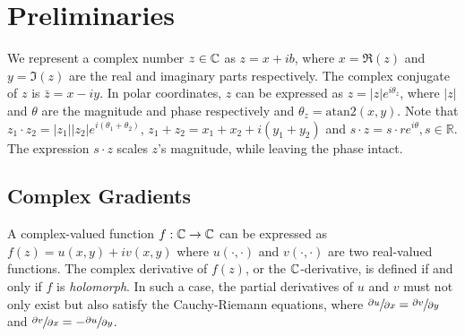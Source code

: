 \documentclass{article}
\begin{document}
\section{Preliminaries}
We represent a complex number $z \in \mathbb{C}$ as $z = x + ib$, where $x = \Re{(z)}$ and $y = \Im{(z)}$ are the real and imaginary parts respectively.  The complex conjugate of $z$ is $\bar{z} = x - iy$.  In polar coordinates, $z$ can be expressed as $z = |z| e^{i\theta_z}$, where $|z|$ and $\theta$ are the magnitude and phase respectively %
and $\theta_z=\text{atan2}(x,y)$. Note that $z_1\cdot z_2 = |z_1||z_2|e^{i(\theta_1 + \theta_2)}$, $z_1 + z_2 = x_1 + x_2 + i(y_1 + y_2)$ and $s\cdot z = s\cdot r e^{i\theta}, s \in \mathbb{R}$. The expression $s\cdot z$ scales $z$'s magnitude, while leaving the phase intact. 

\subsection{Complex Gradients}
A complex-valued function $f : \mathbb{C} \to \mathbb{C}$ can be expressed as $f(z) = u(x,y) + i v(x,y)$ where $u(\cdot,\cdot)$ and $v(\cdot,\cdot)$ are two real-valued functions.  The complex derivative of $f(z)$, or the $\mathbb{C}$-derivative, %
is defined if and only if $f$ is \emph{holomorph}. %
In such a case, the partial derivatives of $u$ and $v$ %
must not only exist but also satisfy the Cauchy-Riemann equations, where $\sfrac{\partial u}{\partial x} = \sfrac{\partial v}{\partial y}$ and $\sfrac{\partial v}{\partial x} = - \sfrac{\partial u}{\partial y}$.
\end{document}
